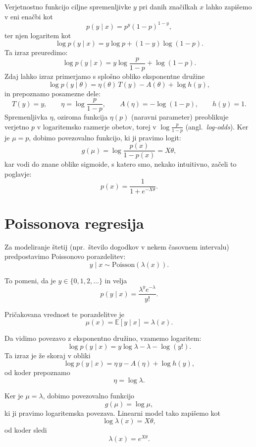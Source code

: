 Verjetnostno funkcijo ciljne spremenljivke $y$ pri danih značilkah $x$ lahko zapišemo v eni enačbi kot
\[
p(y \mid x) = p^y (1-p)^{1-y},
\]
ter njen logaritem kot
\[
\log p(y \mid x) = y \log p + (1-y)\log(1-p).
\]
Ta izraz preuredimo:
\[
\log p(y \mid x) = y \log \frac{p}{1-p} + \log(1-p).
\]
Zdaj lahko izraz primerjamo s splošno obliko eksponentne družine
\[
\log p(y \mid \theta) = \eta(\theta)\,T(y) - A(\theta) + \log h(y),
\]
in prepoznamo posamezne dele:
\[
T(y) = y, \qquad 
\eta = \log \frac{p}{1-p}, \qquad
A(\eta) = -\log(1-p), \qquad
h(y) = 1.
\]
Spremenljivka $\eta$, oziroma funkcija $\eta(p)$ (naravni parameter) preoblikuje verjetno $p$ v logaritemsko razmerje obetov, torej v $\log \frac{p}{1-p}$ (angl.\ \emph{log-odds}). Ker je $\mu = p$, dobimo povezovalno funkcijo, ki ji pravimo logit:
\[
g(\mu) = \log \frac{p(x)}{1-p(x)} = X\theta,
\]
kar vodi do znane oblike sigmoide, s katero smo, nekako intuitivno, začeli to poglavje:
\[
p(x) = \frac{1}{1 + e^{-X\theta}}.
\]

\section{Poissonova regresija}

Za modeliranje štetij (npr.\ število dogodkov v nekem časovnem intervalu) predpostavimo Poissonovo porazdelitev:
\[
y \mid x \sim \mathrm{Poisson}(\lambda(x)).
\]

To pomeni, da je $y \in \{0,1,2,\dots\}$ in velja
\[
p(y \mid x) = \frac{\lambda^y e^{-\lambda}}{y!}.
\]

Pričakovana vrednost te porazdelitve je
\[
\mu(x) = \mathbb{E}[y \mid x] = \lambda(x).
\]

Da vidimo povezavo z eksponentno družino, vzamemo logaritem:
\[
\log p(y \mid x) = y \log \lambda - \lambda - \log(y!).
\]
Ta izraz je že skoraj v obliki
\[
\log p(y \mid x) = \eta \, y - A(\eta) + \log h(y),
\]
od koder prepoznamo
\[
\eta = \log \lambda.
\]

Ker je $\mu = \lambda$, dobimo povezovalno funkcijo
\[
g(\mu) = \log \mu,
\]
ki ji pravimo logaritemska povezava. Linearni model tako zapišemo kot
\[
\log \lambda(x) = X\theta,
\]
od koder sledi
\[
\lambda(x) = e^{X\theta}.
\]

